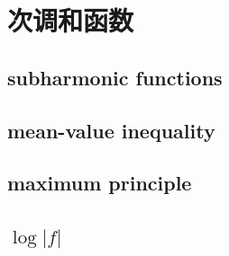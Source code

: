 \section{次调和函数}
\label{b3:sec:1503}


\subsection{subharmonic functions}
\label{b3:subsec:150301}

\subsection{mean-value inequality}
\label{b3:subsec:150302}

\subsection{maximum principle}
\label{b3:subsec:150303}

\subsection{\texorpdfstring{\(\log|f|\)}{|f|}}
\label{b3:subsec:150304}


